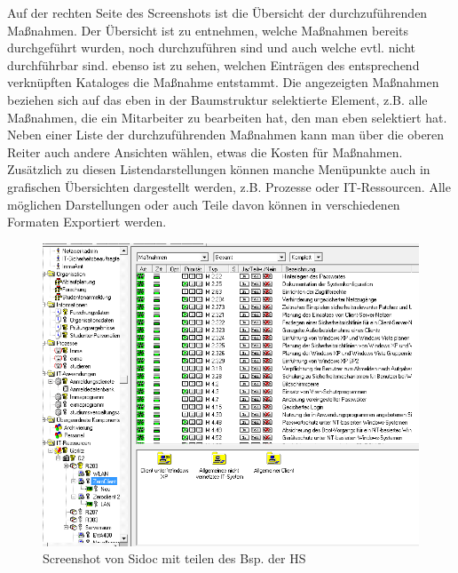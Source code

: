 Auf der rechten Seite des Screenshots ist die Übersicht der durchzuführenden Maßnahmen. Der Übersicht ist zu entnehmen, welche Maßnahmen bereits durchgeführt wurden, noch durchzuführen sind und auch welche evtl. nicht durchführbar sind. ebenso ist zu sehen, welchen Einträgen des entsprechend verknüpften Kataloges die Maßnahme entstammt. Die angezeigten Maßnahmen beziehen sich auf das eben in der Baumstruktur selektierte Element, z.B. alle Maßnahmen, die ein Mitarbeiter zu bearbeiten hat, den man eben selektiert hat.
Neben einer Liste der durchzuführenden Maßnahmen kann man über die oberen Reiter auch andere Ansichten wählen, etwas die Kosten für Maßnahmen.
Zusätzlich zu diesen Listendarstellungen können manche Menüpunkte auch in grafischen Übersichten dargestellt werden, z.B. Prozesse oder IT-Ressourcen.
Alle möglichen Darstellungen oder auch Teile davon können in verschiedenen Formaten Exportiert werden.
\\
\begin{figure}
\label{sidocProgrammScreenshot}
\includegraphics[scale=0.8]{images/sidocProgrammScreenshot.png} 
\caption{Screenshot von Sidoc mit teilen des Bsp. der HS}
\end{figure}
\\
